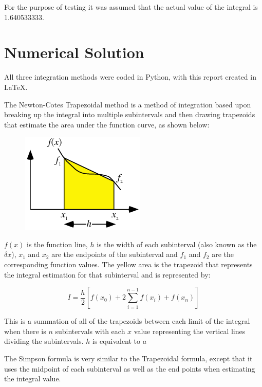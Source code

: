 \documentclass[12pt, letterpaper]{article}
\begin{document}
	For the purpose of testing it was assumed that the actual value of the integral is 1.640533333.

	 
\section{\label{solution}Numerical Solution}
	All three integration methods were coded in Python, with this report created in \LaTeX{}.
	
	The Newton-Cotes Trapezoidal method is a method of integration based upon breaking up the integral into multiple subintervals and then drawing trapezoids that estimate the area under the function curve, as shown below:
	
	\begin{figure}[h]
            		\centering
            		\includegraphics[width=0.5\linewidth]{trapezoid.png}
            	\end{figure}
	
	 \newpage$f(x)$ is the function line, $h$ is the width of each subinterval (also known as the $\delta x$), $x_1$ and $x_2$ are the endpoints of the subinterval and $f_1$ and $f_2$ are the corresponding function values. The yellow area is the trapezoid that represents the integral estimation for that subinterval and is represented by:
	 
	 \begin{equation*} I = \frac{h}{2} \left[f(x_0)+2\sum_{i=1}^{n-1}{f(x_i)}+f(x_n)\right] \end{equation*}
	 
	 This is a summation of all of the trapezoids between each limit of the integral when there is $n$ subintervals with each $x$ value representing the vertical lines dividing the subintervals. $h$ is equivalent to $a$
	 
	 The Simpson formula is very similar to the Trapezoidal formula, except that it uses the midpoint of each subinterval as well as the end points when estimating the integral value.
	 
\end{document}
